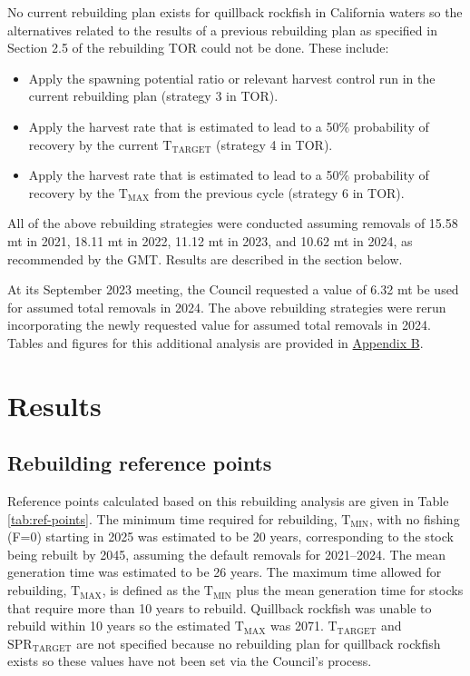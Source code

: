 \documentclass[11pt,
  letterpaper,
]{article}
\begin{document}
No current rebuilding plan exists for quillback rockfish in California waters so the alternatives related to the results of a previous rebuilding plan as specified in Section 2.5 of the rebuilding TOR could not be done. These include:

\begin{itemize}
 \item Apply the spawning potential ratio or relevant harvest control run in the current rebuilding plan (strategy 3 in TOR). 
 \item Apply the harvest rate that is estimated to lead to a 50$\%$ probability of recovery by the current $\text{T}_\text{TARGET}$ (strategy 4 in TOR).
 \item Apply the harvest rate that is estimated to lead to a 50$\%$ probability of recovery by the $\text{T}_\text{MAX}$ from the previous cycle (strategy 6 in TOR).
\end{itemize}

All of the above rebuilding strategies were conducted assuming removals of 15.58 mt in 2021, 18.11 mt in 2022, 11.12 mt in 2023, and 10.62 mt in 2024, as recommended by the GMT. Results are described in the section below.

At its September 2023 meeting, the Council requested a value of 6.32 mt be used for assumed total removals in 2024. The above rebuilding strategies were rerun incorporating the newly requested value for assumed total removals in 2024. Tables and figures for this additional analysis are provided in \protect\hyperlink{append_b}{Appendix B}.

\hypertarget{results}{%
\section{Results}\label{results}}

\hypertarget{rebuilding-reference-points}{%
\subsection{Rebuilding reference points}\label{rebuilding-reference-points}}

Reference points calculated based on this rebuilding analysis are given in Table \ref{tab:ref-points}. The minimum time required for rebuilding, \(\text{T}_\text{MIN}\), with no fishing (F=0) starting in 2025 was estimated to be 20 years, corresponding to the stock being rebuilt by 2045, assuming the default removals for 2021--2024. The mean generation time was estimated to be 26 years. The maximum time allowed for rebuilding, \(\text{T}_\text{MAX}\), is defined as the \(\text{T}_\text{MIN}\) plus the mean generation time for stocks that require more than 10 years to rebuild. Quillback rockfish was unable to rebuild within 10 years so the estimated \(\text{T}_\text{MAX}\) was 2071. \(\text{T}_\text{TARGET}\) and \(\text{SPR}_\text{TARGET}\) are not specified because no rebuilding plan for quillback rockfish exists so these values have not been set via the Council's process.
\end{document}
